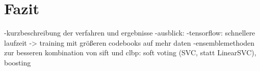 \section{Fazit}
\label{sec:fazit}

-kurzbeschreibung der verfahren und ergebnisse
-ausblick:
	-tensorflow: schnellere laufzeit -> training mit größeren codebooks auf mehr daten
	-ensemblemethoden zur besseren kombination von sift und clbp: soft voting (SVC, statt LinearSVC), boosting